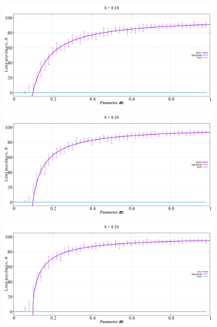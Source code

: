 \begin{figure}[h!]
 \centering
  \includegraphics[width=\linewidth]{images/appendix/simexpt/1.png}
\end{figure}

\begin{figure}[h!]
 \centering
  \includegraphics[width=\linewidth]{images/appendix/simexpt/2.png}
\end{figure}
\newpage
\begin{figure}[h!]
 \centering
  \includegraphics[width=\linewidth]{images/appendix/simexpt/3.png}
\end{figure}

